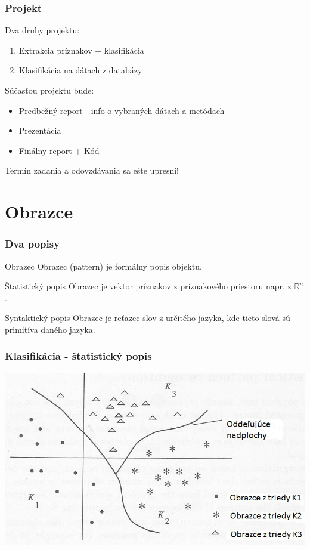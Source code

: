\documentclass{beamer}
\begin{document}
\begin{frame}
\frametitle{Projekt}
Dva druhy projektu:
\begin{enumerate}\setlength
\item Extrakcia príznakov + klasifikácia
\item Klasifikácia na dátach z databázy
\end{enumerate}

\vspace{1em}

Súčasťou projektu bude:
\begin{itemize}\setlength
\item Predbežný report - info o vybraných dátach a metódach
\item Prezentácia
\item Finálny report + Kód
\end{itemize}
\vspace{1em}

Termín zadania a odovzdávania sa ešte upresní!
\end{frame}

\section{Obrazce}

\begin{frame}
\frametitle{Dva popisy}

\begin{block}{Obrazec}
Obrazec (pattern) je formálny popis objektu.
\end{block}

\begin{block}{Štatistický popis}
Obrazec je vektor príznakov z príznakového priestoru napr. z $\mathbb{R}^n$.
\end{block}

\begin{block}{Syntaktický popis}
Obrazec je reťazec slov z určitého jazyka, kde tieto slová sú primitíva daného jazyka.
\end{block}

\end{frame}

\begin{frame}
\frametitle{Klasifikácia - štatistický popis}

\includegraphics[width=\textwidth]{triedy.png}

\end{frame}
\end{document}

